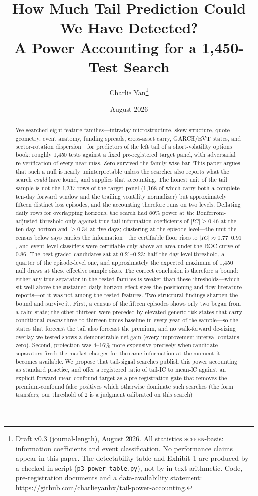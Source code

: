 \documentclass[11pt]{article}
\title{\textbf{How Much Tail Prediction Could We Have Detected?\\
A Power Accounting for a 1,450-Test Search}}
\author{Charlie Yan\thanks{Draft v0.3 (journal-length), August 2026. All statistics
\textsc{screen}-basis: information coefficients and event classification. No performance
claims appear in this paper. The detectability table and Exhibit~1 are produced by a
checked-in script (\texttt{p3\_power\_table.py}), not by in-text arithmetic.
Code, pre-registration documents and a data-availability statement: \url{https://github.com/charlieyanhx/tail-power-accounting}.}}
\date{August 2026}
\begin{document}
\maketitle

\begin{abstract}
We searched eight feature families---intraday microstructure, skew structure, quote geometry,
event anatomy, funding spreads, cross-asset carry, GARCH/EVT states, and sector-rotation
dispersion---for predictors of the left tail of a short-volatility options book: roughly 1{,}450
tests against a fixed pre-registered target panel, with adversarial re-verification of every
near-miss. Zero survived the family-wise bar. This paper argues that such a null is nearly
uninterpretable unless the searcher also reports what the search \emph{could} have found, and
supplies that accounting. The honest unit of the tail sample is not the 1{,}237 rows of the
target panel (1{,}168 of which carry both a complete ten-day forward window and the trailing
volatility normalizer) but approximately fifteen distinct loss episodes, and the accounting
therefore runs on two levels. Deflating daily rows for overlapping horizons, the search had
80\% power at the Bonferroni-adjusted threshold only against true tail information coefficients
of $|IC| \ge 0.46$ at the ten-day horizon and $\ge 0.34$ at five days; clustering at the
episode level---the unit the census below says carries the information---the certifiable floor
rises to $|IC| \approx 0.77$--$0.91$, and event-level classifiers were certifiable only above
an area under the ROC curve of 0.86. The best graded candidates sat at 0.21--0.23: half the
day-level threshold, a quarter of the episode-level one, and approximately the expected maximum
of 1{,}450 null draws at these effective sample sizes. The correct conclusion is therefore a
bound: either any true separator in the tested families is weaker than these thresholds---which
sit well above the sustained daily-horizon effect sizes the positioning and flow literature
reports---or it was not among the tested features. Two structural findings sharpen the bound and survive it. First, a census
of the fifteen episodes shows only two began from a calm state; the other thirteen were
preceded by elevated generic risk states that carry conditional \emph{means} three to thirteen
times baseline in every year of the sample---so the states that forecast the tail also forecast
the premium, and no walk-forward de-sizing overlay we tested shows a demonstrable net gain
(every improvement interval contains zero). Second, protection was 4--16\%
more expensive precisely when candidate separators fired: the market charges for the same
information at the moment it becomes available. We propose that tail-signal searches publish
this power accounting as standard practice, and offer a registered ratio of tail-IC to mean-IC
against an explicit forward-mean confound target as a pre-registration gate that removes the
premium-confound false positives which otherwise dominate such searches (the form transfers;
our threshold of 2 is a judgment calibrated on this search).
\end{abstract}
\end{document}
